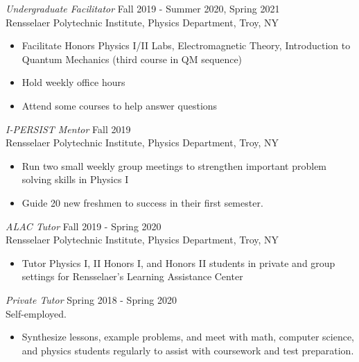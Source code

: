 \documentclass[margin]{rpires}
\begin{document}
\begin{resume}
    {\sl Undergraduate Facilitator} \hfill Fall 2019 - Summer 2020, Spring 2021 \\
    Rensselaer Polytechnic Institute, Physics Department, Troy, NY
    \begin{itemize}  \itemsep -2pt %
        \item Facilitate Honors Physics I/II Labs, Electromagnetic Theory, Introduction to Quantum Mechanics (third course in QM sequence)
        \item Hold weekly office hours
        \item Attend some courses to help answer questions
    \end{itemize}

    {\sl I-PERSIST Mentor} \hfill Fall 2019 \\
    Rensselaer Polytechnic Institute, Physics Department, Troy, NY
    \begin{itemize}  \itemsep -2pt %
        \item Run two small weekly group meetings to strengthen important problem solving skills in Physics I 
        \item Guide 20 new freshmen to success in their first semester.
    \end{itemize}

    {\sl ALAC Tutor} \hfill Fall 2019 - Spring 2020 \\
    Rensselaer Polytechnic Institute, Physics Department, Troy, NY
    \begin{itemize}  \itemsep -2pt %
        \item Tutor Physics I, II Honors I, and Honors II students in private and group settings for Rensselaer's Learning Assistance Center
    \end{itemize}

    {\sl Private Tutor} \hfill Spring 2018 - Spring 2020 \\
    Self-employed.
    \begin{itemize}  \itemsep -2pt %
        \item Synthesize lessons, example problems, and meet with math, computer science, and physics students regularly to assist with coursework and test preparation.
    \end{itemize}
    
    

\end{resume}
\end{document}
